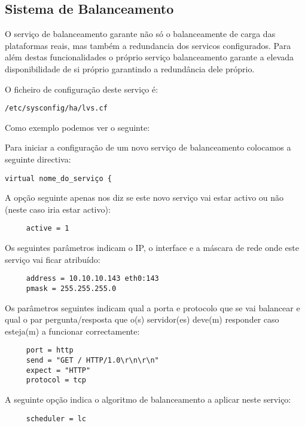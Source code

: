 \subsection{Sistema de Balanceamento}

O serviço de balanceamento garante não só o balanceamente de carga das plataformas reais, mas também a redundancia dos servicos configurados.
Para além destas funcionalidades o próprio serviço balanceamento garante a elevada disponibilidade de si próprio garantindo a redundância dele próprio.

O ficheiro de configuração deste serviço é:

\begin{Verbatim}[commandchars=\\\{\}]
/etc/sysconfig/ha/lvs.cf
\end{Verbatim}

Como exemplo podemos ver o seguinte:

Para iniciar a configuração de um novo serviço de balanceamento colocamos a seguinte directiva:

\begin{verbatim}
virtual nome_do_serviço {
\end{verbatim}

A opção seguinte apenas nos diz se este novo serviço vai estar activo ou não (neste caso iria estar activo):

\begin{verbatim}
     active = 1
\end{verbatim}

Os seguintes parâmetros indicam o IP, o interface e a máscara de rede onde este serviço vai ficar atribuído:

\begin{verbatim}
     address = 10.10.10.143 eth0:143
     pmask = 255.255.255.0
\end{verbatim}

Os parâmetros seguintes indicam qual a porta e protocolo que se vai balancear e qual o par pergunta/resposta que o(s) servidor(es) deve(m) responder caso esteja(m) a funcionar correctamente:

\begin{verbatim}
     port = http
     send = "GET / HTTP/1.0\r\n\r\n"
     expect = "HTTP"
     protocol = tcp
\end{verbatim}

A seguinte opção indica o algoritmo de balanceamento a aplicar neste serviço:

\begin{verbatim}
     scheduler = lc
\end{verbatim}

